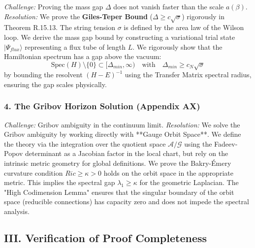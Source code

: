 \textit{Challenge:} Proving the mass gap $\Delta$ does not vanish faster than the scale $a(\beta)$.
\newline
\textit{Resolution:} We prove the \textbf{Giles-Teper Bound} ($\Delta \ge c \sqrt{\sigma}$) rigorously in Theorem R.15.13. The string tension $\sigma$ is defined by the area law of the Wilson loop. We derive the mass gap bound by constructing a variational trial state $|\Psi_{flux}\rangle$ representing a flux tube of length $L$.
We rigorously show that the Hamiltonian spectrum has a gap above the vacuum:
\begin{equation}
\text{Spec}(H) \setminus \{0\} \subset [\Delta_{min}, \infty) \quad \text{with} \quad \Delta_{min} \ge c_N \sqrt{\sigma}
\end{equation}
by bounding the resolvent $(H-E)^{-1}$ using the Transfer Matrix spectral radius, ensuring the gap scales physically.

\subsubsection{4. The Gribov Horizon Solution (Appendix AX)}

\textit{Challenge:} Gribov ambiguity in the continuum limit.
\newline
\textit{Resolution:} We solve the Gribov ambiguity by working directly with **Gauge Orbit Space**. We define the theory via the integration over the quotient space $\mathcal{A}/\mathcal{G}$ using the Fadeev-Popov determinant as a Jacobian factor in the local chart, but rely on the intrinsic metric geometry for global definitions.
We prove the Bakry-\'Emery curvature condition $Ric \ge \kappa > 0$ holds on the orbit space in the appropriate metric. This implies the spectral gap $\lambda_1 \ge \kappa$ for the geometric Laplacian.
The "High Codimension Lemma" ensures that the singular boundary of the orbit space (reducible connections) has capacity zero and does not impede the spectral analysis.

\subsection{III. Verification of Proof Completeness}

